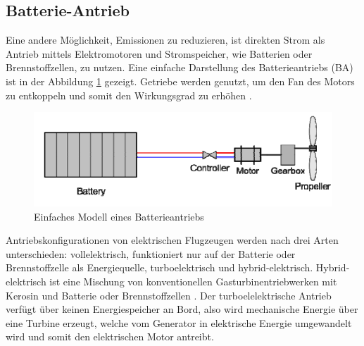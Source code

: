 \subsection{Batterie-Antrieb}
Eine andere Möglichkeit, Emissionen zu reduzieren, ist direkten Strom als Antrieb 
mittels Elektromotoren und Stromspeicher, wie Batterien oder Brennstoffzellen, zu nutzen.
Eine einfache Darstellung des Batterieantriebs (BA) ist in der Abbildung \ref{ba} gezeigt. 
Getriebe werden genutzt, um den Fan des Motors zu entkoppeln und somit den Wirkungsgrad zu erhöhen \cite{hepperle2012electric}.
%
\begin{figure}[h]
	\centering
	\includegraphics[width=0.7\linewidth]{Bilder/BA.png}
	\caption[Einfaches Modell eines Batterieantriebs]{Einfaches Modell eines Batterieantriebs \cite{hepperle2012electric}}
	\label{ba}
\end{figure}

Antriebskonfigurationen von elektrischen Flugzeugen werden nach drei Arten unterschieden: 
vollelektrisch, funktioniert nur auf der Batterie oder Brennstoffzelle als Energiequelle, 
turboelektrisch und hybrid-elektrisch. 
Hybrid-elektrisch ist eine Mischung von konventionellen Gasturbinentriebwerken mit Kerosin 
und Batterie oder Brennstoffzellen \cite{dahal2021techno}. 
Der turboelelektrische Antrieb verfügt über keinen Energiespeicher an Bord, 
also wird mechanische Energie über eine Turbine erzeugt, welche vom Generator in elektrische Energie 
umgewandelt wird und somit den elektrischen Motor antreibt. %

